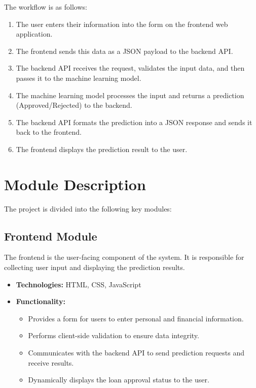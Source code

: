 \documentclass{report}
\begin{document}
The workflow is as follows:
\begin{enumerate}
    \item The user enters their information into the form on the frontend web application.
    \item The frontend sends this data as a JSON payload to the backend API.
    \item The backend API receives the request, validates the input data, and then passes it to the machine learning model.
    \item The machine learning model processes the input and returns a prediction (Approved/Rejected) to the backend.
    \item The backend API formats the prediction into a JSON response and sends it back to the frontend.
    \item The frontend displays the prediction result to the user.
\end{enumerate}

\section{Module Description}
The project is divided into the following key modules:

\subsection{Frontend Module}
The frontend is the user-facing component of the system. It is responsible for collecting user input and displaying the prediction results.
\begin{itemize}
    \item \textbf{Technologies:} HTML, CSS, JavaScript
    \item \textbf{Functionality:}
    \begin{itemize}
        \item Provides a form for users to enter personal and financial information.
        \item Performs client-side validation to ensure data integrity.
        \item Communicates with the backend API to send prediction requests and receive results.
        \item Dynamically displays the loan approval status to the user.
    \end{itemize}
\end{itemize}
\end{document}
